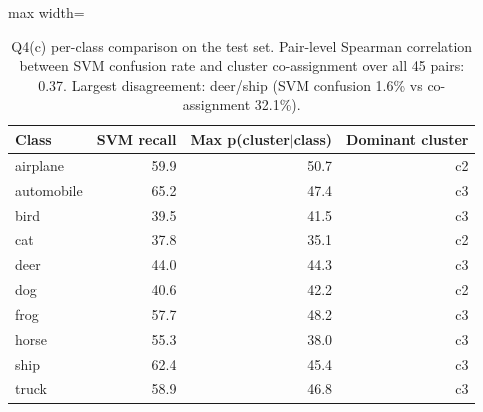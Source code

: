 \begin{table}[t]
\centering
\footnotesize
\setlength{\tabcolsep}{3.5pt}
\begin{adjustbox}{max width=\linewidth}
\begin{tabular}{lrrr}
\toprule
Class & SVM recall & Max p(cluster$|$class) & Dominant cluster \\
\midrule
airplane & 59.9 & 50.7 & c2 \\
automobile & 65.2 & 47.4 & c3 \\
bird & 39.5 & 41.5 & c3 \\
cat & 37.8 & 35.1 & c2 \\
deer & 44.0 & 44.3 & c3 \\
dog & 40.6 & 42.2 & c2 \\
frog & 57.7 & 48.2 & c3 \\
horse & 55.3 & 38.0 & c3 \\
ship & 62.4 & 45.4 & c3 \\
truck & 58.9 & 46.8 & c3 \\
\bottomrule
\end{tabular}
\end{adjustbox}
\caption{Q4(c) per-class comparison on the test set. Pair-level Spearman correlation between SVM confusion rate and cluster co-assignment over all 45 pairs: 0.37. Largest disagreement: deer/ship (SVM confusion 1.6\% vs co-assignment 32.1\%).}
\label{tab:q4cpc}
\end{table}
